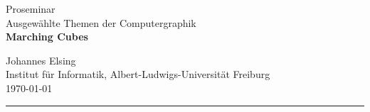 \documentclass[12pt]{article}
\begin{document}
\begin{titlepage}
    \centering
    \huge
    Proseminar\\[0.2cm]
    Ausgewählte Themen der Computergraphik\\
    \vspace{0.5cm}
    \Huge\bfseries
    Marching Cubes\\
    \vspace{2cm}

    \Large
    \textcolor[gray]{0.2}{Johannes Elsing}\\
    \textcolor[gray]{0.2}{Institut für Informatik, Albert-Ludwigs-Universität Freiburg}\\
    \vspace{0.8cm}
    \Large
    \today

    \vfill
    \noindent\color{black}\rule{\textwidth}{2pt}

    \noindent
    \colorbox{gray!20}{}
\end{titlepage}

\sectionfont{\color{gray}}

\newpage
\end{document}
